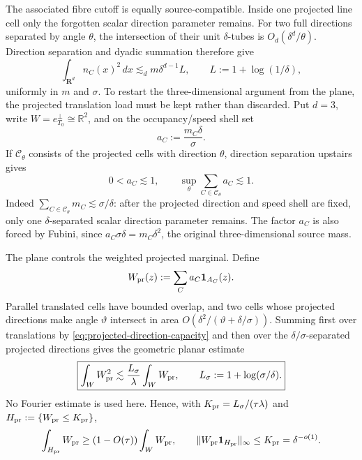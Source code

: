 \documentclass[11pt]{article}
\newcommand{\R}{\mathbf R}
\begin{document}
The associated fibre cutoff is equally source-compatible.  Inside one
projected line cell only the forgotten scalar direction parameter remains.
For two full directions separated by angle \(\theta\), the intersection of
their unit \(\delta\)-tubes is \(O_d(\delta^d/\theta)\).  Direction separation
and dyadic summation therefore give
\begin{equation}\label{eq:root-fibre-cordoba-energy}
 \int_{\R^d}n_C(x)^2\,dx
 \lesssim_d m\delta^{d-1}L,
 \qquad L:=1+\log(1/\delta),
\end{equation}
uniformly in \(m\) and \(\sigma\).  To restart the three-dimensional argument
from the plane, the projected translation load must be kept rather than
discarded.  Put \(d=3\), write \(W=e_{T_0}^{\perp}\cong\mathbb R^2\), and on
the occupancy/speed shell set
\begin{equation}\label{eq:projected-capacity-weight}
 a_C:=\frac{m_C\delta}{\sigma}.
\end{equation}
If \(\mathcal C_\theta\) consists of the projected cells with direction
\(\theta\), direction separation upstairs gives
\begin{equation}\label{eq:projected-direction-capacity}
 0<a_C\lesssim1,
 \qquad
 \sup_\theta\sum_{C\in\mathcal C_\theta}a_C\lesssim1.
\end{equation}
Indeed \(\sum_{C\in\mathcal C_\theta}m_C\lesssim\sigma/\delta\): after the
projected direction and speed shell are fixed, only one \(\delta\)-separated
scalar direction parameter remains.  The factor \(a_C\) is also forced by
Fubini, since
\(a_C\sigma\delta=m_C\delta^2\), the original three-dimensional source mass.

The plane controls the weighted projected marginal.  Define
\begin{equation}\label{eq:weighted-planar-projected-load}
 W_{\rm pr}(z):=\sum_Ca_C{\bf1}_{A_C}(z).
\end{equation}
Parallel translated cells have bounded overlap, and two cells whose projected
directions make angle \(\vartheta\) intersect in area
\(O(\delta^2/(\vartheta+\delta/\sigma))\).  Summing first over translations by
\eqref{eq:projected-direction-capacity} and then over the
\(\delta/\sigma\)-separated projected directions gives the geometric planar
estimate
\begin{equation}\label{eq:weighted-planar-cordoba}
 \boxed{
  \int_W W_{\rm pr}^2
  \lesssim
  \frac{L_\sigma}{\lambda}\int_WW_{\rm pr},
  \qquad
  L_\sigma:=1+\log(\sigma/\delta).}
\end{equation}
No Fourier estimate is used here.  Hence, with
\(K_{\rm pr}=L_\sigma/(\tau\lambda)\) and
\(H_{\rm pr}:=\{W_{\rm pr}\le K_{\rm pr}\}\),
\begin{equation}\label{eq:weighted-planar-pruning}
 \int_{H_{\rm pr}}W_{\rm pr}
 \ge(1-O(\tau))\int_WW_{\rm pr},
 \qquad
 \|W_{\rm pr}{\bf1}_{H_{\rm pr}}\|_\infty
 \le K_{\rm pr}=\delta^{-o(1)}.
\end{equation}
\end{document}
